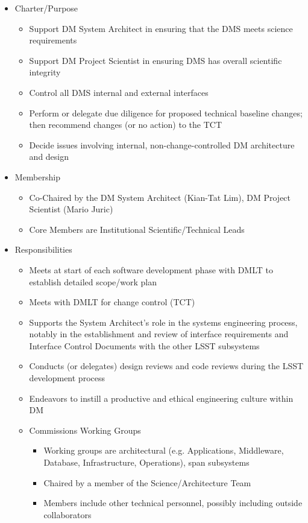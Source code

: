 \begin{itemize}
\item Charter/Purpose
	\begin{itemize}
	\item Support DM System Architect in ensuring that the DMS meets science requirements
	\item Support DM Project Scientist in ensuring DMS has overall scientific integrity
	\item Control all DMS internal and external interfaces
	\item Perform or delegate due diligence for proposed technical baseline changes; then recommend changes (or no action) to the TCT
	\item Decide issues involving internal, non-change-controlled DM architecture and design
	\end{itemize}
\item Membership
	\begin{itemize}
	\item Co-Chaired by the DM System Architect (Kian-Tat Lim), DM Project Scientist (Mario Juric)
	\item Core Members are Institutional Scientific/Technical Leads
	\end{itemize}
\item Responsibilities
	\begin{itemize}
	\item Meets at start of each software development phase with DMLT to establish detailed scope/work plan
	\item Meets with DMLT for change control (TCT)
	\item Supports the System Architect's role in the systems engineering process, notably in the establishment and review of interface requirements and Interface Control Documents with the other LSST subsystems
	\item Conducts (or delegates) design reviews and code reviews during the LSST development process
	\item Endeavors to instill a productive and ethical engineering culture within DM
	\item Commissions Working Groups
		\begin{itemize}
		\item Working groups are architectural (e.g. Applications, Middleware, Database, Infrastructure, Operations), span subsystems
		\item Chaired by a member of the Science/Architecture Team
		\item Members include other technical personnel, possibly including outside collaborators
		\end{itemize}
	\end{itemize}
\end{itemize}

